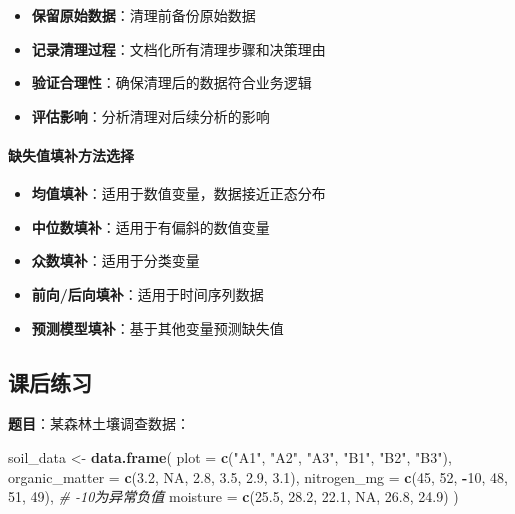 \documentclass[
  twoside]{book}
\newenvironment{Shaded}{\begin{snugshade}}{\end{snugshade}}
\newcommand{\AttributeTok}[1]{\textcolor[rgb]{0.13,0.29,0.53}{#1}}
\newcommand{\CommentTok}[1]{\textcolor[rgb]{0.56,0.35,0.01}{\textit{#1}}}
\newcommand{\ConstantTok}[1]{\textcolor[rgb]{0.56,0.35,0.01}{#1}}
\newcommand{\DecValTok}[1]{\textcolor[rgb]{0.00,0.00,0.81}{#1}}
\newcommand{\FloatTok}[1]{\textcolor[rgb]{0.00,0.00,0.81}{#1}}
\newcommand{\FunctionTok}[1]{\textcolor[rgb]{0.13,0.29,0.53}{\textbf{#1}}}
\newcommand{\NormalTok}[1]{#1}
\newcommand{\OtherTok}[1]{\textcolor[rgb]{0.56,0.35,0.01}{#1}}
\newcommand{\SpecialCharTok}[1]{\textcolor[rgb]{0.81,0.36,0.00}{\textbf{#1}}}
\newcommand{\StringTok}[1]{\textcolor[rgb]{0.31,0.60,0.02}{#1}}
\providecommand{\tightlist}{%
  \setlength{\itemsep}{0pt}\setlength{\parskip}{0pt}}
\begin{document}
\begin{itemize}
\tightlist
\item
  \textbf{保留原始数据}：清理前备份原始数据
\item
  \textbf{记录清理过程}：文档化所有清理步骤和决策理由
\item
  \textbf{验证合理性}：确保清理后的数据符合业务逻辑
\item
  \textbf{评估影响}：分析清理对后续分析的影响
\end{itemize}

\hypertarget{ux7f3aux5931ux503cux586bux8865ux65b9ux6cd5ux9009ux62e9}{%
\paragraph{缺失值填补方法选择}\label{ux7f3aux5931ux503cux586bux8865ux65b9ux6cd5ux9009ux62e9}}

\begin{itemize}
\tightlist
\item
  \textbf{均值填补}：适用于数值变量，数据接近正态分布
\item
  \textbf{中位数填补}：适用于有偏斜的数值变量
\item
  \textbf{众数填补}：适用于分类变量
\item
  \textbf{前向/后向填补}：适用于时间序列数据
\item
  \textbf{预测模型填补}：基于其他变量预测缺失值
\end{itemize}

\hypertarget{ux8bfeux540eux7ec3ux4e60-5}{%
\subsection{课后练习}\label{ux8bfeux540eux7ec3ux4e60-5}}

\textbf{题目}：某森林土壤调查数据：

\begin{Shaded}
\begin{Highlighting}[]
\NormalTok{soil\_data }\OtherTok{\textless{}{-}} \FunctionTok{data.frame}\NormalTok{(}
  \AttributeTok{plot =} \FunctionTok{c}\NormalTok{(}\StringTok{"A1"}\NormalTok{, }\StringTok{"A2"}\NormalTok{, }\StringTok{"A3"}\NormalTok{, }\StringTok{"B1"}\NormalTok{, }\StringTok{"B2"}\NormalTok{, }\StringTok{"B3"}\NormalTok{),}
  \AttributeTok{organic\_matter =} \FunctionTok{c}\NormalTok{(}\FloatTok{3.2}\NormalTok{, }\ConstantTok{NA}\NormalTok{, }\FloatTok{2.8}\NormalTok{, }\FloatTok{3.5}\NormalTok{, }\FloatTok{2.9}\NormalTok{, }\FloatTok{3.1}\NormalTok{),}
  \AttributeTok{nitrogen\_mg =} \FunctionTok{c}\NormalTok{(}\DecValTok{45}\NormalTok{, }\DecValTok{52}\NormalTok{, }\SpecialCharTok{{-}}\DecValTok{10}\NormalTok{, }\DecValTok{48}\NormalTok{, }\DecValTok{51}\NormalTok{, }\DecValTok{49}\NormalTok{),  }\CommentTok{\# {-}10为异常负值}
  \AttributeTok{moisture =} \FunctionTok{c}\NormalTok{(}\FloatTok{25.5}\NormalTok{, }\FloatTok{28.2}\NormalTok{, }\FloatTok{22.1}\NormalTok{, }\ConstantTok{NA}\NormalTok{, }\FloatTok{26.8}\NormalTok{, }\FloatTok{24.9}\NormalTok{)}
\NormalTok{)}
\end{Highlighting}
\end{Shaded}
\end{document}
